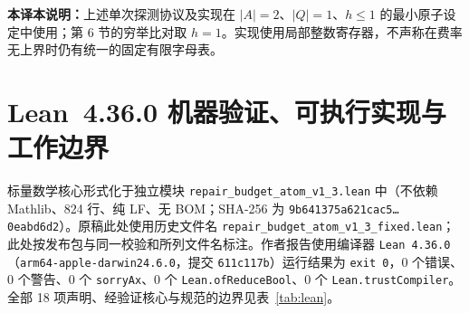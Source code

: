\documentclass[11pt,a4paper]{article}
\theoremstyle{preprintthm}
\theoremstyle{preprintdef}
\begin{document}
\noindent\textbf{本译本说明：}上述单次探测协议及实现在 $|A|=2$、$|Q|=1$、$h\le1$ 的最小原子设定中使用；第 6 节的穷举比对取 $h=1$。实现使用局部整数寄存器，不声称在费率无上界时仍有统一的固定有限字母表。

\section{Lean~4.36.0 机器验证、可执行实现与工作边界}

标量数学核心形式化于独立模块 \texttt{repair\_\allowbreak budget\_\allowbreak atom\_\allowbreak v1\_3.lean} 中（不依赖 Mathlib、824 行、纯 LF、无 BOM；SHA-256 为 \texttt{9b641375a621cac5\ldots0eabd6d2}）。原稿此处使用历史文件名 \texttt{repair\_\allowbreak budget\_\allowbreak atom\_\allowbreak v1\_3\_fixed.lean}；此处按发布包与同一校验和所列文件名标注。作者报告使用编译器 \texttt{Lean 4.36.0}（\texttt{arm64-apple-darwin24.6.0}，提交 \texttt{611c117b}）运行结果为 \texttt{exit 0}，0 个错误、0 个警告、0 个 \texttt{sorryAx}、0 个 \texttt{Lean.ofReduceBool}、0 个 \texttt{Lean.trustCompiler}。全部 18 项声明、经验证核心与规范的边界见表~\ref{tab:lean}。
\end{document}
